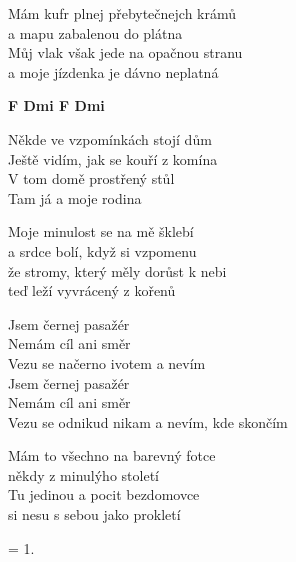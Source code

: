 
\ve{}
Mám kufr plnej přebytečnejch krámů\\
a mapu zabalenou do plátna\\
Můj vlak však jede na opačnou stranu\\
a moje jízdenka je dávno neplatná

\re{}
{\footnotesize \textbf{F Dmi F Dmi}}
 
\ve{}
Někde ve vzpomínkách stojí dům\\
Ještě vidím, jak se kouří z komína\\
V tom domě prostřený stůl\\
Tam já a moje rodina

\ve{}
Moje minulost se na mě šklebí\\
a srdce bolí, když si vzpomenu\\
že stromy, který měly dorůst k nebi\\
teď leží vyvrácený z kořenů

\cho{}
Jsem černej pasažér\\
Nemám cíl ani směr\\
Vezu se načerno ivotem a nevím\\
Jsem černej pasažér\\
Nemám cíl ani směr\\
Vezu se odnikud nikam a nevím, kde skončím

\ve{}
Mám to všechno na barevný fotce\\
někdy z minulýho století\\
Tu jedinou a pocit bezdomovce\\
si nesu s sebou jako prokletí

\cho{}

\ve{} = 1.

\esong
